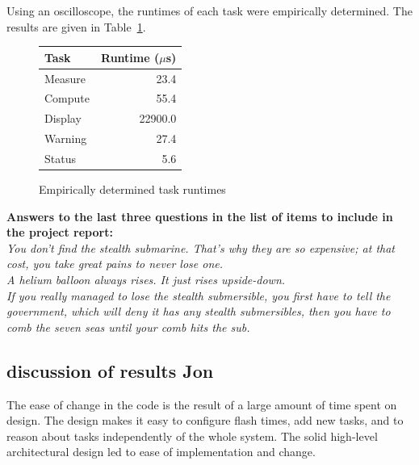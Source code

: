 \documentclass[12pt]{article} %
\begin{document}
Using an oscilloscope, the runtimes of each task were empirically determined. The results are given in Table~\ref{tab:taskRuntimes}.

\begin{figure}[h]
	\centering
	\begin{tabular}{|l|r|} 
		\hline
		Task & Runtime ($\mu$s) \\ \hline
		Measure & 23.4 \\ \hline
		Compute & 55.4 \\ \hline
		Display & 22900.0 \\ \hline
		Warning & 27.4	\\ \hline
		Status & 5.6	\\ \hline
	\end{tabular}
	\caption{Empirically determined task runtimes\label{tab:taskRuntimes}}
\end{figure}


\textbf{Answers to the last three questions in the list of items to include in the project report:} \\
\emph{You don't find the stealth submarine. That's why they are so expensive; at that cost, you take great pains to never lose one.\\
A helium balloon always rises. It just rises upside-down. \\
If you really managed to lose the stealth submersible, you first have to tell the government, which will deny it has any stealth submersibles, then you have to comb the seven seas until your comb hits the sub.}
 
\subsection{discussion of results  Jon}
The ease of change in the code is the result of a large amount of time spent on
design.  The design makes it easy to configure flash times, add new tasks, and
to reason about tasks independently of the whole system.  The solid high-level
architectural design led to ease of implementation and change.
\end{document}
